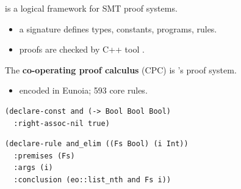 \documentclass[handout, t, lualatex, compress, 11pt]{beamer}
\begin{document}
\begin{frame}{\secheader}%
    \eoname{} is a logical framework for SMT proof systems.
	\begin{itemize}
		\item<+-> a signature defines
		      types, constants, programs, rules.
		\item<+-> proofs are checked by C++ tool .
	\end{itemize}
	\vfill
	\noindent{}
\end{frame}


\begin{frame}[fragile]{\secheader}%
	The \textbf{co-operating proof calculus} (CPC) is 's proof system.
	\begin{itemize}
		\item<+-> encoded in Eunoia; 593 core rules.
	\end{itemize}
	\begin{eobox}
	\begin{lstlisting}[basicstyle=\lpmono\footnotesize]
(declare-const and (-> Bool Bool Bool)
  :right-assoc-nil true)\end{lstlisting}
	\listsep
	\begin{lstlisting}[basicstyle=\lpmono\footnotesize]
(declare-rule and_elim ((Fs Bool) (i Int))
  :premises (Fs)
  :args (i)
  :conclusion (eo::list_nth and Fs i))\end{lstlisting}
	\end{eobox}
\end{frame}
\end{document}

